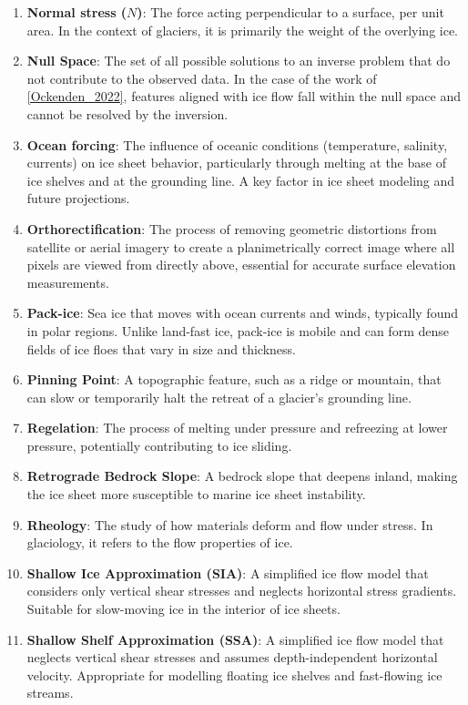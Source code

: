 \begin{enumerate}
\item \textbf{Normal stress ($N$)}: The force acting perpendicular to a surface, per unit area. In the context of glaciers, it is primarily the weight of the overlying ice.
\item \textbf{Null Space}: The set of all possible solutions to an inverse problem that do not contribute to the observed data. In the case of the work of \ref{Ockenden_2022}, features aligned with ice flow fall within the null space and cannot be resolved by the inversion.
\item \textbf{Ocean forcing}: The influence of oceanic conditions (temperature, salinity, currents) on ice sheet behavior, particularly through melting at the base of ice shelves and at the grounding line. A key factor in ice sheet modeling and future projections.
\item \textbf{Orthorectification}: The process of removing geometric distortions from satellite or aerial imagery to create a planimetrically correct image where all pixels are viewed from directly above, essential for accurate surface elevation measurements.
\item \textbf{Pack-ice}: Sea ice that moves with ocean currents and winds, typically found in polar regions. Unlike land-fast ice, pack-ice is mobile and can form dense fields of ice floes that vary in size and thickness.
\item \textbf{Pinning Point}: A topographic feature, such as a ridge or mountain, that can slow or temporarily halt the retreat of a glacier's grounding line.
\item \textbf{Regelation}: The process of melting under pressure and refreezing at lower pressure, potentially contributing to ice sliding.
\item \textbf{Retrograde Bedrock Slope}: A bedrock slope that deepens inland, making the ice sheet more susceptible to marine ice sheet instability.
\item \textbf{Rheology}: The study of how materials deform and flow under stress. In glaciology, it refers to the flow properties of ice.
\item \textbf{Shallow Ice Approximation (SIA)}: A simplified ice flow model that considers only vertical shear stresses and neglects horizontal stress gradients. Suitable for slow-moving ice in the interior of ice sheets.
\item \textbf{Shallow Shelf Approximation (SSA)}: A simplified ice flow model that neglects vertical shear stresses and assumes depth-independent horizontal velocity. Appropriate for modelling floating ice shelves and fast-flowing ice streams.

\end{enumerate}
